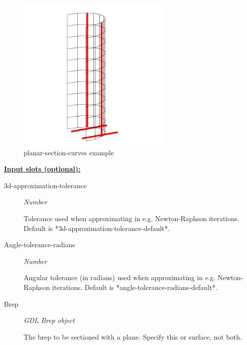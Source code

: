 \documentclass [11pt]{book}
\begin{document}
\begin{itemize}
\begin{figure}
\begin{center}
\includegraphics[width=3in,height=3in]{../images/example-planar-section-curves.pdf}
\end{center}

\caption{planar-section-curves example}

\label{fig:planar-section-curves}

\end{figure}





\textbf{
\underline{Input slots (optional):}}

\begin{description}

\item [3d-approximation-tolerance]
\emph{Number}

 Tolerance used when approximating in e.g. Newton-Raphson iterations.
Default is *3d-approximation-tolerance-default*.




\item [Angle-tolerance-radians]
\emph{Number}

 Angular tolerance (in radians) used when approximating in e.g. Newton-Raphson iterations.
Default is *angle-tolerance-radians-default*.




\item [Brep]
\emph{GDL Brep object}

 The brep to be sectioned with a plane. Specify this or surface, not both.





\end{description}
\end{itemize}
\end{document}
